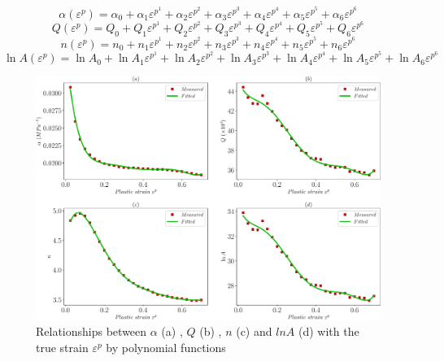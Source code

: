 \documentclass[twoside,english,1p,final,sort&compress]{elsarticle}
\theoremstyle{plain}
\begin{document}
\begin{equation}
\label{eq:alpha}
\alpha(\varepsilon^p) = \alpha_0 + \alpha_1\varepsilon^{{p^1}} + \alpha_2\varepsilon^{p^2} + \alpha_3\varepsilon^{p^3} + \alpha_4\varepsilon^{p^4} + \alpha_5\varepsilon^{p^5} + \alpha_6\varepsilon^{p^6}
\end{equation}
\begin{equation}
\label{eq:Q}
Q(\varepsilon^p) = Q_0 + Q_1\varepsilon^{{p^1}} + Q_2\varepsilon^{p^2} + Q_3\varepsilon^{p^3} + Q_4\varepsilon^{p^4} + Q_5\varepsilon^{p^5} + Q_6\varepsilon^{p^6}
\end{equation}
\begin{equation}
\label{eq:n}
n(\varepsilon^p) = n_0 + n_1\varepsilon^{{p^1}} + n_2\varepsilon^{p^2} + n_3\varepsilon^{p^3} + n_4\varepsilon^{p^4} + n_5\varepsilon^{p^5} + n_6\varepsilon^{p^6}
\end{equation}
\begin{equation}
\label{eq:lnA}
\ln A(\varepsilon^p) = \ln A_0 + \ln A_1\varepsilon^{{p^1}} + \ln A_2\varepsilon^{p^2} + \ln A_3\varepsilon^{p^3} + \ln A_4\varepsilon^{p^4} + \ln A_5\varepsilon^{p^5} + \ln A_6\varepsilon^{p^6}
\end{equation}
\begin{figure}[!ht]
\centering
\includegraphics[width=1.02\columnwidth]{newFigures/ARparameters}
\caption{Relationships between $\alpha$ (a)  , $Q$ (b) , $n$ (c)  and $lnA$ (d)  with the true strain $\varepsilon^p$ by polynomial functions}
\label{fig:ARparameters}
\end{figure}
\end{document}
